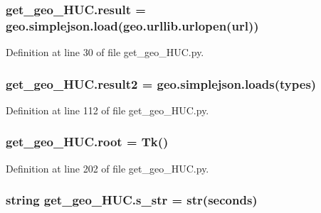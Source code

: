 \subsubsection[{\texorpdfstring{result}{result}}]{\setlength{\rightskip}{0pt plus 5cm}get\+\_\+geo\+\_\+\+H\+U\+C.\+result = geo.\+simplejson.\+load(geo.\+urllib.\+urlopen({\bf url}))}\hypertarget{namespaceget__geo___h_u_c_a3cbe3b2d0670a061bbc0c7be84c34d33}{}\label{namespaceget__geo___h_u_c_a3cbe3b2d0670a061bbc0c7be84c34d33}


Definition at line 30 of file get\+\_\+geo\+\_\+\+H\+U\+C.\+py.

\subsubsection[{\texorpdfstring{result2}{result2}}]{\setlength{\rightskip}{0pt plus 5cm}get\+\_\+geo\+\_\+\+H\+U\+C.\+result2 = geo.\+simplejson.\+loads({\bf types})}\hypertarget{namespaceget__geo___h_u_c_abc778873c4005f461907aeb3d7e5c567}{}\label{namespaceget__geo___h_u_c_abc778873c4005f461907aeb3d7e5c567}


Definition at line 112 of file get\+\_\+geo\+\_\+\+H\+U\+C.\+py.

\subsubsection[{\texorpdfstring{root}{root}}]{\setlength{\rightskip}{0pt plus 5cm}get\+\_\+geo\+\_\+\+H\+U\+C.\+root = Tk()}\hypertarget{namespaceget__geo___h_u_c_a938476c6ba710cee3c941c3def8456a8}{}\label{namespaceget__geo___h_u_c_a938476c6ba710cee3c941c3def8456a8}


Definition at line 202 of file get\+\_\+geo\+\_\+\+H\+U\+C.\+py.

\subsubsection[{\texorpdfstring{s\+\_\+str}{s_str}}]{\setlength{\rightskip}{0pt plus 5cm}string get\+\_\+geo\+\_\+\+H\+U\+C.\+s\+\_\+str = str({\bf seconds})}\hypertarget{namespaceget__geo___h_u_c_a48fac2a37a1bbe32015504a0dc9f6c59}{}\label{namespaceget__geo___h_u_c_a48fac2a37a1bbe32015504a0dc9f6c59}


